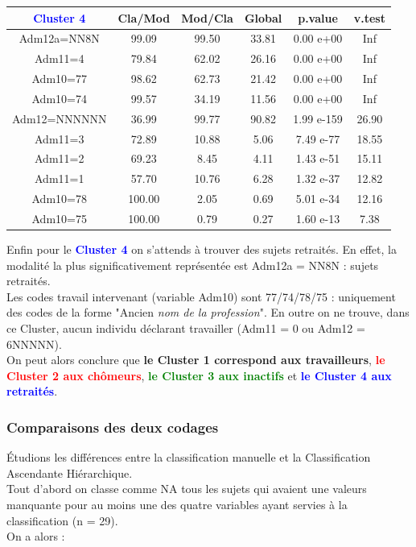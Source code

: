 \documentclass{book}
\begin{document}
\setlength\arrayrulewidth{2pt}
\begin{tabular}{|c||ccccc|}
\hline
   \textbf{\textcolor{blue}{Cluster 4}} &Cla/Mod  &   Mod/Cla      &Global      & p.value  &   v.test\\
   \hline
   \hline
Adm12a=NN8N &  99.09 &99.50 &33.81 & 0.00 e+00  &      Inf\\
Adm11=4      & 79.84 &62.02 &26.16 & 0.00 e+00  &      Inf\\
Adm10=77      &98.62 &62.73 &21.42 & 0.00 e+00  &      Inf\\
Adm10=74      &99.57 &34.19 &11.56 & 0.00 e+00  &      Inf\\
Adm12=NNNNNN  &36.99 &99.77 &90.82 &1.99 e-159  &26.90\\
Adm11=3       &72.89 &10.88 &5.06 & 7.49 e-77  &18.55\\
Adm11=2       &69.23 & 8.45 &4.11 & 1.43 e-51  &15.11\\
Adm11=1       &57.70 &10.76 &6.28 & 1.32 e-37  &12.82\\
Adm10=78     &100.00 & 2.05 &0.69 & 5.01 e-34  &12.16\\
Adm10=75     &100.00 & 0.79 &0.27  &1.60 e-13 &  7.38\\
\hline
\end{tabular}

\noindent
Enfin pour le \textbf{\textcolor{blue}{Cluster 4}} on s'attends à trouver des sujets retraités. En effet, la modalité la plus significativement représentée est Adm12a = NN8N : sujets retraités. \\
Les codes travail intervenant (variable Adm10) sont 77/74/78/75 : uniquement des codes de la forme "Ancien \textit{nom de la profession}".
En outre on ne trouve, dans ce Cluster, aucun individu déclarant travailler (Adm11 = 0 ou Adm12 = 6NNNNN).\\

\noindent
On peut alors conclure que  \textbf{le Cluster 1 correspond aux travailleurs}, \textbf{\textcolor{red}{le Cluster 2 aux chômeurs}}, \textbf{\textcolor{green}{le Cluster 3 aux inactifs}} et \textbf{\textcolor{blue}{le Cluster 4 aux retraités}}.

\subsubsection{Comparaisons des deux codages}
\noindent
Étudions les différences entre la classification manuelle et la Classification Ascendante Hiérarchique.\\
Tout d'abord on classe comme NA tous les sujets qui avaient une valeurs manquante pour au moins une des quatre variables ayant servies à la classification (n = 29).\\
On a alors : \\
\end{document}
